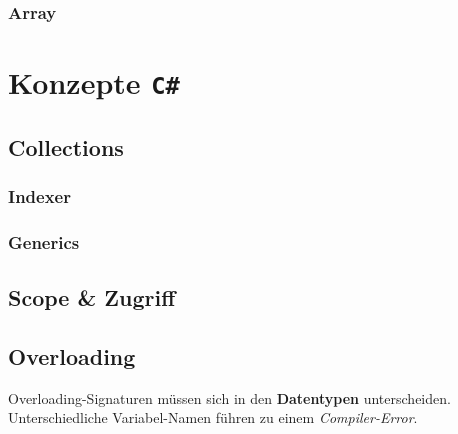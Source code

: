 \documentclass[
  9pt,
  a4paperpaper,
  DIV=11]{scrartcl}
\numberwithin{equation}{section}
\begin{document}
\begin{multicols}{2}
\hypertarget{array}{%
\subsubsection{Array}\label{array}}

\hypertarget{konzepte-c}{%
\section{\texorpdfstring{Konzepte
\texttt{C\#}}{Konzepte C\#}}\label{konzepte-c}}

\hypertarget{collections}{%
\subsection{Collections}\label{collections}}

\hypertarget{indexer}{%
\subsubsection{Indexer}\label{indexer}}

\hypertarget{generics}{%
\subsubsection{Generics}\label{generics}}

\hypertarget{scope-zugriff}{%
\subsection{Scope \& Zugriff}\label{scope-zugriff}}

\hypertarget{overloading}{%
\subsection{Overloading}\label{overloading}}

\begin{tcolorbox}[enhanced jigsaw, colback=white, toptitle=1mm, coltitle=black, left=2mm, opacityback=0, leftrule=.75mm, colbacktitle=quarto-callout-important-color!10!white, title=\textcolor{quarto-callout-important-color}{\faExclamation}\hspace{0.5em}{Wichtig}, breakable, bottomrule=.15mm, bottomtitle=1mm, titlerule=0mm, toprule=.15mm, rightrule=.15mm, colframe=quarto-callout-important-color-frame, arc=.35mm, opacitybacktitle=0.6]

Overloading-Signaturen müssen sich in den \textbf{Datentypen}
unterscheiden. Unterschiedliche Variabel-Namen führen zu einem
\emph{Compiler-Error}.


\end{tcolorbox}
\end{multicols}
\end{document}
